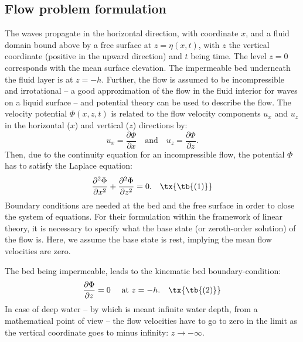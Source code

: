\documentclass[a4paper,12pt]{report}
\begin{document}
\subsection{Flow problem formulation}
The waves propagate in the horizontal direction, with coordinate \( x \), and a fluid domain bound above by a free surface at \( z = \eta(x,t) \), with \( z \) the vertical coordinate (positive in the upward direction) and \( t \) being time. The level \( z = 0 \) corresponds with the mean surface elevation. The impermeable bed underneath the fluid layer is at \( z = -h \). Further, the flow is assumed to be incompressible and irrotational – a good approximation of the flow in the fluid interior for waves on a liquid surface – and potential theory can be used to describe the flow. The velocity potential \( \Phi(x, z, t) \) is related to the flow velocity components \( u_x \) and \( u_z \) in the horizontal (\( x \)) and vertical (\( z \)) directions by:
\[
u_x = \frac{\partial \Phi}{\partial x} \quad \text{and} \quad u_z = \frac{\partial \Phi}{\partial z}.
\]
Then, due to the continuity equation for an incompressible flow, the potential \( \Phi \) has to satisfy the Laplace equation:
\begin{equation}
\frac{\partial^2 \Phi}{\partial x^2} + \frac{\partial^2 \Phi}{\partial z^2} = 0.\quad\tx{\tb{(1)}}
\end{equation}
Boundary conditions are needed at the bed and the free surface in order to close the system of equations. For their formulation within the framework of linear theory, it is necessary to specify what the base state (or zeroth-order solution) of the flow is. Here, we assume the base state is rest, implying the mean flow velocities are zero.

The bed being impermeable, leads to the kinematic bed boundary-condition:
\begin{equation}
\frac{\partial \Phi}{\partial z} = 0 \quad \text{ at } z = -h.\quad\tx{\tb{(2)}}
\end{equation}
In case of deep water – by which is meant infinite water depth, from a mathematical point of view – the flow velocities have to go to zero in the limit as the vertical coordinate goes to minus infinity: \( z \to -\infty \).
\end{document}
